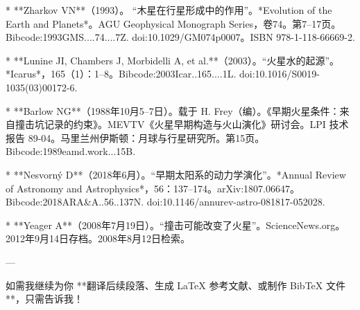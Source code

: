 * **Zharkov VN**（1993）。 “木星在行星形成中的作用”。*Evolution of the Earth and Planets*。AGU Geophysical Monograph Series，卷74。第7–17页。Bibcode:1993GMS....74....7Z. doi:10.1029/GM074p0007。ISBN 978-1-118-66669-2.

* **Lunine JI, Chambers J, Morbidelli A, et al.**（2003）。“火星水的起源”。*Icarus*，165（1）：1–8。Bibcode:2003Icar..165....1L. doi:10.1016/S0019-1035(03)00172-6.

* **Barlow NG**（1988年10月5–7日）。载于 H. Frey（编）。《早期火星条件：来自撞击坑记录的约束》。MEVTV《火星早期构造与火山演化》研讨会。LPI 技术报告 89-04。马里兰州伊斯顿：月球与行星研究所。第15页。Bibcode:1989eamd.work...15B.

* **Nesvorný D**（2018年6月）。“早期太阳系的动力学演化”。*Annual Review of Astronomy and Astrophysics*，56：137–174。arXiv:1807.06647。Bibcode:2018ARA&A..56..137N. doi:10.1146/annurev-astro-081817-052028.

* **Yeager A**（2008年7月19日）。“撞击可能改变了火星”。ScienceNews.org。2012年9月14日存档。2008年8月12日检索。

---

如需我继续为你 **翻译后续段落、生成 LaTeX 参考文献、或制作 BibTeX 文件**，只需告诉我！




